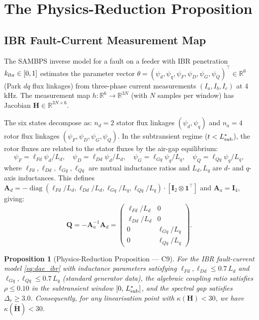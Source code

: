 \documentclass[11pt,a4paper]{article}
\theoremstyle{plain}
\newtheorem{proposition}{Proposition}
\theoremstyle{definition}
\theoremstyle{remark}
\newcommand{\bfH}{\mathbf{H}}
\newcommand{\bfHt}{\tilde{\mathbf{H}}}
\newcommand{\bfA}{\mathbf{A}}
\newcommand{\bfQ}{\mathbf{Q}}
\newcommand{\bfI}{\mathbf{I}}
\newcommand{\bfone}{\mathbf{1}}
\newcommand{\kibr}{k_{\rm ibr}}
\DeclareMathOperator{\diag}{diag}
\begin{document}
\section{The Physics-Reduction Proposition}
\label{sec:c9}

\subsection{IBR Fault-Current Measurement Map}

The SAMBPS inverse model for a fault on a feeder with IBR penetration
$\kibr \in [0,1]$ estimates the parameter vector
$\theta = (\psi_d, \psi_q, \psi_F, \psi_D, \psi_G, \psi_Q)^\top \in \mathbb{R}^6$
(Park $dq$ flux linkages) from three-phase current measurements
$(I_a, I_b, I_c)$ at 4\,kHz.
The measurement map $h: \mathbb{R}^6 \to \mathbb{R}^{3N}$ (with $N$ samples
per window) has Jacobian $\bfH \in \mathbb{R}^{3N \times 6}$.

The six states decompose as: $n_d = 2$ stator flux linkages
$(\psi_d, \psi_q)$ and $n_a = 4$ rotor flux linkages
$(\psi_F, \psi_D, \psi_G, \psi_Q)$.  In the subtransient regime
($t < L^*_{\rm sub}$), the rotor fluxes are related to the stator
fluxes by the air-gap equilibrium:
\begin{equation}
  \psi_F = \ell_{Fd}\psi_d/L_d, \quad
  \psi_D = \ell_{Dd}\psi_d/L_d, \quad
  \psi_G = \ell_{Gq}\psi_q/L_q, \quad
  \psi_Q = \ell_{Qq}\psi_q/L_q,
  \label{eq:dae_ibr}
\end{equation}
where $\ell_{Fd}, \ell_{Dd}, \ell_{Gq}, \ell_{Qq}$ are mutual
inductance ratios and $L_d, L_q$ are $d$- and $q$-axis inductances.
This defines $\bfA_d = -\diag(\ell_{Fd}/L_d, \ell_{Dd}/L_d,
\ell_{Gq}/L_q, \ell_{Qq}/L_q) \cdot [\bfI_2 \otimes \bfone^\top]$
and $\bfA_a = \bfI_4$, giving:
\begin{equation}
  \bfQ = -\bfA_a^{-1}\bfA_d =
  \begin{pmatrix}
    \ell_{Fd}/L_d & 0 \\
    \ell_{Dd}/L_d & 0 \\
    0 & \ell_{Gq}/L_q \\
    0 & \ell_{Qq}/L_q
  \end{pmatrix}.
  \label{eq:Q_ibr}
\end{equation}

\begin{proposition}[Physics-Reduction Proposition --- C9]
\label{prop:c9}
For the IBR fault-current model \eqref{eq:dae_ibr} with
inductance parameters satisfying
$\ell_{Fd}, \ell_{Dd} \leq 0.7\,L_d$ and
$\ell_{Gq}, \ell_{Qq} \leq 0.7\,L_q$ (standard generator data),
the algebraic coupling ratio satisfies $\rho \leq 0.10$ in the
subtransient window $[0,\,L^*_{\rm sub}]$, and the spectral gap
satisfies $\Delta_r \geq 3.0$.
Consequently, for any linearisation point with
$\kappa(\bfH) < 30$, we have $\kappa(\bfHt) < 30$.
\end{proposition}
\end{document}
